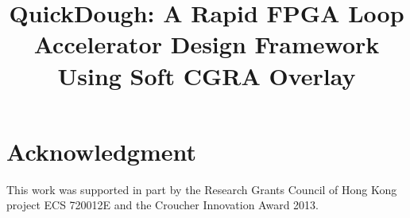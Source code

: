 \documentclass[conference]{IEEEtran}
\begin{document}
%
\title{QuickDough: A Rapid FPGA Loop Accelerator Design Framework Using Soft CGRA Overlay}



 \author{
 }



% 

\maketitle

\begin{abstract}

\end{abstract}







\section*{Acknowledgment}
This work was supported in part by the Research Grants Council of Hong Kong project ECS 720012E and
the Croucher Innovation Award 2013. 



\end{document}
